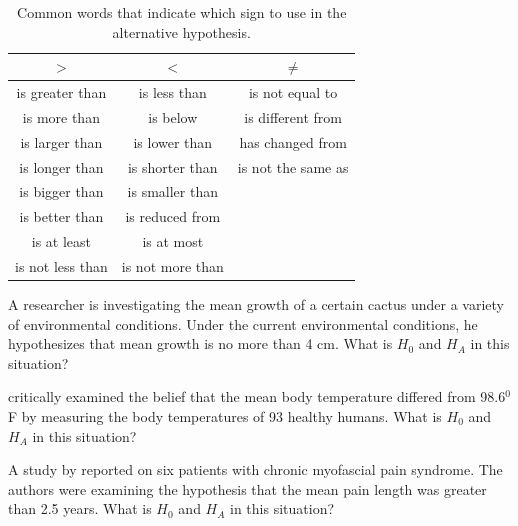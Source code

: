\documentclass[10pt,openany]{book}\usepackage[]{graphicx}\usepackage[]{color}
\begin{document}
\begin{table}[htbp]
  \caption{Common words that indicate which sign to use in the alternative hypothesis.}
  \label{tab:HAwords}
  \centering
  \begin{tabular}{ccc}
\hline\hline
$>$ & $<$ & $\neq$ \\
\hline
is greater than & is less than & is not equal to \\
is more than & is below & is different from \\
is larger than & is lower than & has changed from \\
is longer than & is shorter than & is not the same as \\
is bigger than & is smaller than &  \\
is better than & is reduced from &  \\
is at least & is at most &  \\
is not less than & is not more than &  \\
\hline\hline
  \end{tabular}
\end{table}


\newpage
\begin{exsection}
  \item \label{revex:HypTCactus} A researcher is investigating the mean growth of a certain cactus under a variety of environmental conditions. Under the current environmental conditions, he hypothesizes that mean growth is no more than 4 cm. What is $H_{0}$ and $H_{A}$ in this situation? 
  \item \label{revex:HypTBodyTemp} \cite{Machowiaketal1992} critically examined the belief that the mean body temperature differed from 98.6$^{0}$F by measuring the body temperatures of 93 healthy humans.  What is $H_{0}$ and $H_{A}$ in this situation? 
  \item \label{revex:HypTPain} A study by \cite{Cheshireetal1994} reported on six patients with chronic myofascial pain syndrome. The authors were examining the hypothesis that the mean pain length was greater than 2.5 years.  What is $H_{0}$ and $H_{A}$ in this situation? 
\end{exsection}


\vspace{-12pt}
\end{document}
